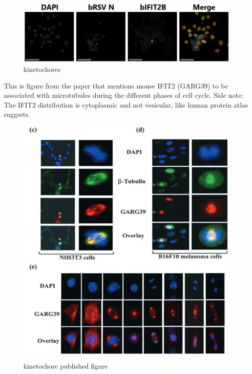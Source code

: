 \begin{figure}
    \centering
    \includegraphics[width=1\linewidth]{10. Chapter 5//Figs//04. IFIT2AB Discussion/05. kinetochores.png}
    \caption[kinetochores]{kinetochores}
    \label{fig:kinetochores}
\end{figure}

This is figure from the paper that mentions mouse IFIT2 (GARG39) to be associated with microtubules during the different phases of cell cycle.
Side note: The IFIT2 distribution is cytoplasmic and not vesicular, like human protein atlas suggests.

\begin{figure}
    \centering
    \includegraphics[width=1\linewidth]{10. Chapter 5//Figs//04. IFIT2AB Discussion/06. kinetochore published figure.png}
    \caption[kinetochore published figure]{kinetochore published figure}
    \label{fig:kinetochore published figure}
\end{figure}

